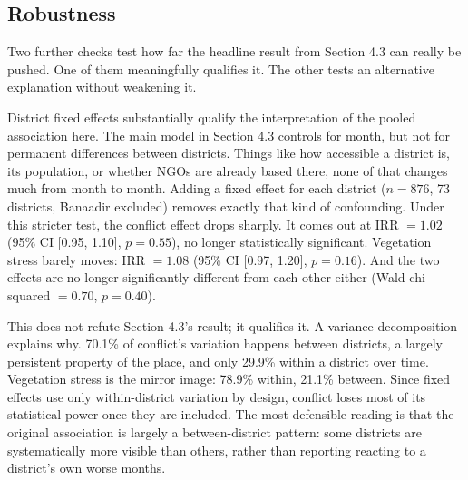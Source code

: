 \documentclass[12pt,a4paper]{article}
\begin{document}
\subsection{Robustness}

Two further checks test how far the headline result from Section 4.3 can really be pushed. One of them meaningfully qualifies it. The other tests an alternative explanation without weakening it.

District fixed effects substantially qualify the interpretation of the pooled association here. The main model in Section 4.3 controls for month, but not for permanent differences between districts. Things like how accessible a district is, its population, or whether NGOs are already based there, none of that changes much from month to month. Adding a fixed effect for each district ($n = 876$, 73 districts, Banaadir excluded) removes exactly that kind of confounding. Under this stricter test, the conflict effect drops sharply. It comes out at IRR $= 1.02$ (95\% CI [0.95, 1.10], $p = 0.55$), no longer statistically significant. Vegetation stress barely moves: IRR $= 1.08$ (95\% CI [0.97, 1.20], $p = 0.16$). And the two effects are no longer significantly different from each other either (Wald chi-squared $= 0.70$, $p = 0.40$).

This does not refute Section 4.3's result; it qualifies it. A variance decomposition explains why. 70.1\% of conflict's variation happens between districts, a largely persistent property of the place, and only 29.9\% within a district over time. Vegetation stress is the mirror image: 78.9\% within, 21.1\% between. Since fixed effects use only within-district variation by design, conflict loses most of its statistical power once they are included. The most defensible reading is that the original association is largely a between-district pattern: some districts are systematically more visible than others, rather than reporting reacting to a district's own worse months.
\end{document}
